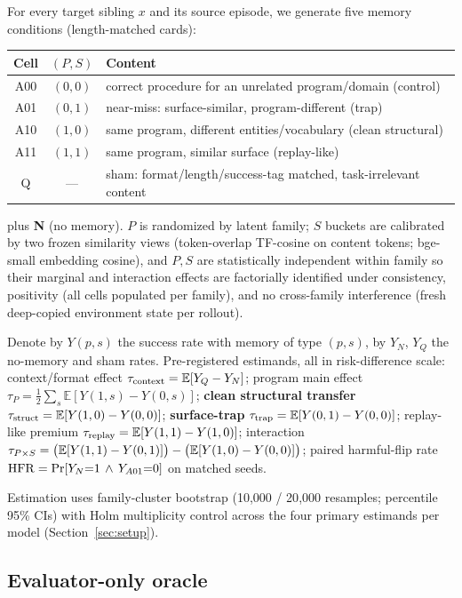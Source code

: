For every target sibling $x$ and its source episode, we generate five memory conditions (length-matched cards):

\begin{center}
\begin{tabular}{ccl}
\toprule
Cell & $(P,S)$ & Content \\
\midrule
A00 & $(0,0)$ & correct procedure for an unrelated program/domain (control) \\
A01 & $(0,1)$ & near-miss: surface-similar, program-different (trap) \\
A10 & $(1,0)$ & same program, different entities/vocabulary (clean structural) \\
A11 & $(1,1)$ & same program, similar surface (replay-like) \\
Q & --- & sham: format/length/success-tag matched, task-irrelevant content \\
\bottomrule
\end{tabular}
\end{center}

plus \textbf{N} (no memory). $P$ is randomized by latent family; $S$ buckets are calibrated by two frozen similarity views (token-overlap TF-cosine on content tokens; bge-small embedding cosine), and $P,S$ are statistically independent within family so their marginal and interaction effects are factorially identified under consistency, positivity (all cells populated per family), and no cross-family interference (fresh deep-copied environment state per rollout).

Denote by $Y(p,s)$ the success rate with memory of type $(p,s)$, by $Y_N$, $Y_Q$ the no-memory and sham rates. Pre-registered estimands, all in risk-difference scale: context/format effect $\tau_{\mathrm{context}} = \mathbb{E}[Y_Q - Y_N]$; program main effect $\tau_P=\tfrac12\sum_s \mathbb{E}[Y(1,s)-Y(0,s)]$; \textbf{clean structural transfer} $\tau_{\mathrm{struct}} = \mathbb{E}[Y(1,0)-Y(0,0)]$; \textbf{surface-trap} $\tau_{\mathrm{trap}}=\mathbb{E}[Y(0,1)-Y(0,0)]$; replay-like premium $\tau_{\mathrm{replay}} = \mathbb{E}[Y(1,1)-Y(1,0)]$; interaction $\tau_{P\times S} = \big(\mathbb{E}[Y(1,1)-Y(0,1)]\big) - \big(\mathbb{E}[Y(1,0)-Y(0,0)]\big)$; paired harmful-flip rate $\mathrm{HFR} = \Pr[Y_N{=}1 \,\wedge\, Y_{A01}{=}0]$ on matched seeds.

Estimation uses family-cluster bootstrap (10{,}000 / 20{,}000 resamples; percentile 95\% CIs) with Holm multiplicity control across the four primary estimands per model (Section~\ref{sec:setup}).

\subsection{Evaluator-only oracle}\label{ssec:oracle}

